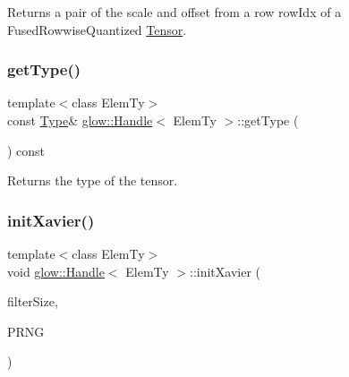 \begin{DoxyReturn}{Returns}
a pair of the scale and offset from a row {\ttfamily row\+Idx} of a Fused\+Rowwise\+Quantized \hyperlink{classglow_1_1_tensor}{Tensor}. 
\end{DoxyReturn}
\mbox{\label{classglow_1_1_handle_a012e00131edb5c3112c630c0e957c4cf}} 
\subsubsection{\texorpdfstring{get\+Type()}{getType()}}
{\footnotesize\ttfamily template$<$class Elem\+Ty$>$ \\
const \hyperlink{structglow_1_1_type}{Type}\& \hyperlink{classglow_1_1_handle}{glow\+::\+Handle}$<$ Elem\+Ty $>$\+::get\+Type (\begin{DoxyParamCaption}{ }\end{DoxyParamCaption}) const\hspace{0.3cm}{\ttfamily [inline]}}

\begin{DoxyReturn}{Returns}
the type of the tensor. 
\end{DoxyReturn}
\mbox{\label{classglow_1_1_handle_aebb37b02423e68e306cd4e0067e8689e}} 
\subsubsection{\texorpdfstring{init\+Xavier()}{initXavier()}}
{\footnotesize\ttfamily template$<$class Elem\+Ty$>$ \\
void \hyperlink{classglow_1_1_handle}{glow\+::\+Handle}$<$ Elem\+Ty $>$\+::init\+Xavier (\begin{DoxyParamCaption}\item[{size\+\_\+t}]{filter\+Size,  }\item[{\hyperlink{classglow_1_1_pseudo_r_n_g}{Pseudo\+R\+NG} \&}]{P\+R\+NG }\end{DoxyParamCaption})\hspace{0.3cm}{\ttfamily [inline]}}

